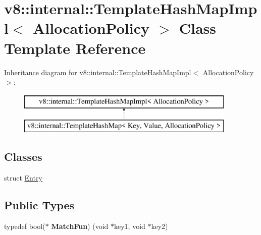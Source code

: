 \hypertarget{classv8_1_1internal_1_1_template_hash_map_impl}{}\section{v8\+:\+:internal\+:\+:Template\+Hash\+Map\+Impl$<$ Allocation\+Policy $>$ Class Template Reference}
\label{classv8_1_1internal_1_1_template_hash_map_impl}
Inheritance diagram for v8\+:\+:internal\+:\+:Template\+Hash\+Map\+Impl$<$ Allocation\+Policy $>$\+:\begin{figure}[H]
\begin{center}
\leavevmode
\includegraphics[height=2.000000cm]{classv8_1_1internal_1_1_template_hash_map_impl}
\end{center}
\end{figure}
\subsection*{Classes}
\begin{DoxyCompactItemize}
\item 
struct \hyperlink{structv8_1_1internal_1_1_template_hash_map_impl_1_1_entry}{Entry}
\end{DoxyCompactItemize}
\subsection*{Public Types}
\begin{DoxyCompactItemize}
\item 
typedef bool($\ast$ {\bfseries Match\+Fun}) (void $\ast$key1, void $\ast$key2)\hypertarget{classv8_1_1internal_1_1_template_hash_map_impl_a72f31025c87628f7236ecec4ff485062}{}\label{classv8_1_1internal_1_1_template_hash_map_impl_a72f31025c87628f7236ecec4ff485062}

\end{DoxyCompactItemize}
